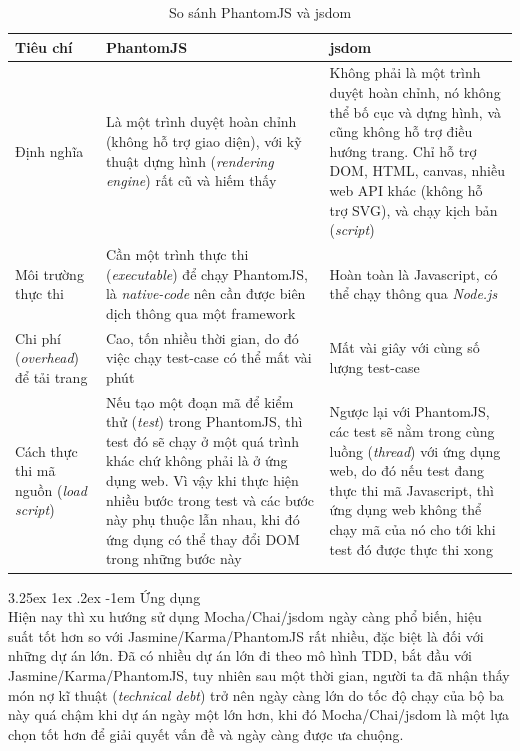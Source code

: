 \documentclass[12pt,a4paper,twoside]{article}
\makeatletter
\newcommand{\myparagraph}[1]{\paragraph{#1}\mbox{}\\} %
\renewcommand\paragraph{\@startsection{paragraph}{5}{\z@}%
  {3.25ex \@plus1ex \@minus.2ex}%
  {-1em}%
  {\normalfont\normalsize\bfseries}}
\makeatother
\begin{document}
\begin{table}
\caption{So sánh PhantomJS và jsdom}
\begin{tabu} to 1\textwidth { | X[l] | X[l] | X[l] | }
\hline
\textbf{Tiêu chí} & \textbf{PhantomJS} & \textbf{jsdom}\\
\hline\hline
Định nghĩa & Là một trình duyệt hoàn chỉnh (không hỗ trợ giao diện), với kỹ thuật dựng hình (\textit{rendering engine}) rất cũ và hiếm thấy & Không phải là một trình duyệt hoàn chỉnh, nó không thể bố cục và dựng hình, và cũng không hỗ trợ điều hướng trang. Chỉ hỗ trợ DOM, HTML, canvas, nhiều web API khác (không hỗ trợ SVG), và chạy kịch bản (\textit{script})\\
\hline
Môi trường thực thi & Cần một trình thực thi (\textit{executable}) để chạy PhantomJS, là \textit{native-code} nên cần được biên dịch thông qua một framework & Hoàn toàn là Javascript, có thể chạy thông qua \textit{Node.js} \\
\hline
Chi phí (\textit{overhead}) để tải trang & Cao, tốn nhiều thời gian, do đó việc chạy test-case có thể mất vài phút & Mất vài giây với cùng số lượng test-case \\
\hline
Cách thực thi mã nguồn (\textit{load script}) & Nếu tạo một đoạn mã  để kiểm thử (\textit{test}) trong PhantomJS, thì test đó sẽ chạy ở một quá trình khác chứ không phải là ở ứng dụng web. Vì vậy khi thực hiện nhiều bước trong test và các bước này phụ thuộc lẫn nhau, khi đó ứng dụng có thể thay đổi DOM trong những bước này & Ngược lại với PhantomJS, các test sẽ nằm trong cùng luồng (\textit{thread}) với ứng dụng web, do đó nếu test đang thực thi mã Javascript, thì ứng dụng web không thể chạy mã của nó cho tới khi test đó được thực thi xong\\
\hline
\end{tabu}
\label{table:phantomjs_jsdom}
\end{table}

\myparagraph{Ứng dụng}
Hiện nay thì xu hướng sử dụng Mocha/Chai/jsdom ngày càng phổ biến, hiệu suất tốt hơn so với Jasmine/Karma/PhantomJS rất nhiều, đặc biệt là đối với những dự án lớn. Đã có nhiều dự án lớn đi theo mô hình TDD, bắt đầu với Jasmine/Karma/PhantomJS, tuy nhiên sau một thời gian, người ta đã nhận thấy món nợ kĩ thuật (\textit{technical debt}) trở nên ngày càng lớn do tốc độ chạy của bộ ba này quá chậm khi dự án ngày một lớn hơn, khi đó Mocha/Chai/jsdom là một lựa chọn tốt hơn để giải quyết vấn đề và ngày càng được ưa chuộng.
\end{document}
